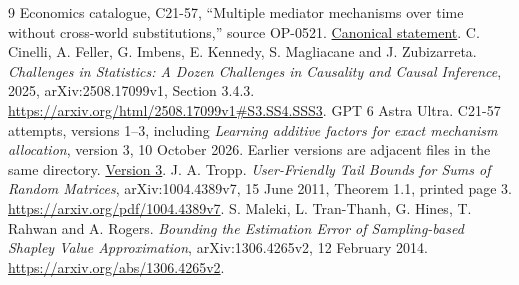\documentclass[11pt,a4paper]{article}
\numberwithin{equation}{section}
\theoremstyle{definition}
\begin{document}
\begin{thebibliography}{9}
 Economics catalogue, C21-57, ``Multiple mediator
mechanisms over time without cross-world substitutions,'' source OP-0521.
\href{https://github.com/mehmetmars7/Erdosproblems-llm-hunter/blob/738965af403ff4375a58450fd971c43a817843bc/attacks/open_problems/economics/statements/C21-57.tex}{Canonical statement}.
 C. Cinelli, A. Feller, G. Imbens, E. Kennedy,
S. Magliacane and J. Zubizarreta. \emph{Challenges in Statistics:
A Dozen Challenges in Causality and Causal Inference}, 2025,
arXiv:2508.17099v1, Section 3.4.3.
\url{https://arxiv.org/html/2508.17099v1#S3.SS4.SSS3}.
 GPT 6 Astra Ultra. C21-57 attempts, versions 1--3,
including \emph{Learning additive factors for exact mechanism allocation},
version 3, 10 October 2026. Earlier versions are adjacent files in the
same directory.
\href{https://github.com/mehmetmars7/Erdosproblems-llm-hunter/blob/738965af403ff4375a58450fd971c43a817843bc/attacks/open_problems/economics/gpt_6_astra_ultra/C21-57_v3.tex}{Version 3}.
 J. A. Tropp. \emph{User-Friendly Tail Bounds for Sums
of Random Matrices}, arXiv:1004.4389v7, 15 June 2011, Theorem 1.1,
printed page 3.
\url{https://arxiv.org/pdf/1004.4389v7}.
 S. Maleki, L. Tran-Thanh, G. Hines, T. Rahwan and
A. Rogers. \emph{Bounding the Estimation Error of Sampling-based
Shapley Value Approximation}, arXiv:1306.4265v2, 12 February 2014.
\url{https://arxiv.org/abs/1306.4265v2}.
\end{thebibliography}
\end{document}
